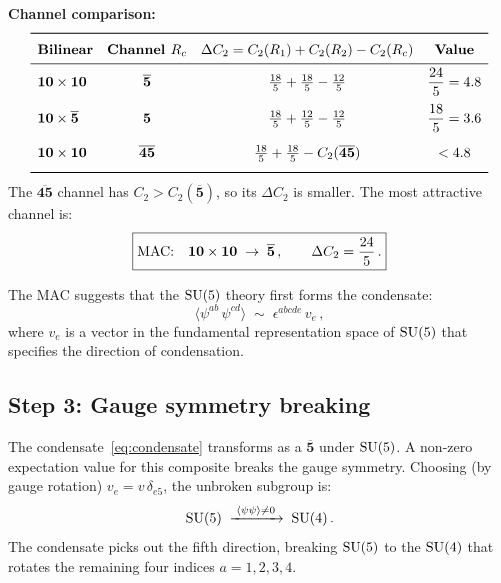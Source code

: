 \documentclass[11pt,a4paper]{article}
\begin{document}
\textbf{Channel comparison:}
\begin{equation}\label{eq:MAC-channels}
\renewcommand{\arraystretch}{1.4}
\begin{array}{l c c c}
\toprule
\textbf{Bilinear} & \textbf{Channel } R_c
  & \Delta C_2 = C_2(R_1) + C_2(R_2) - C_2(R_c)
  & \textbf{Value} \\
\midrule
\mathbf{10} \times \mathbf{10}
  & \overline{\mathbf{5}}
  & \tfrac{18}{5} + \tfrac{18}{5} - \tfrac{12}{5}
  & \dfrac{24}{5} = 4.8 \\[8pt]
\mathbf{10} \times \overline{\mathbf{5}}
  & \mathbf{5}
  & \tfrac{18}{5} + \tfrac{12}{5} - \tfrac{12}{5}
  & \dfrac{18}{5} = 3.6 \\[8pt]
\mathbf{10} \times \mathbf{10}
  & \overline{\mathbf{45}}
  & \tfrac{18}{5} + \tfrac{18}{5} - C_2(\overline{\mathbf{45}})
  & < 4.8 \\[4pt]
\bottomrule
\end{array}
\end{equation}
The $\overline{\mathbf{45}}$ channel has $C_2 > C_2(\overline{\mathbf{5}})$,
so its $\Delta C_2$ is smaller.  The most attractive channel is:
\begin{equation}\label{eq:MAC-result}
  \boxed{%
    \text{MAC:}\quad
    \mathbf{10} \times \mathbf{10}
    \;\to\; \overline{\mathbf{5}}\,,
    \qquad
    \Delta C_2 = \frac{24}{5}\,.
  }
\end{equation}

The MAC suggests that the $\mathrm{SU}(5)$ theory first forms the condensate:
\begin{equation}\label{eq:condensate}
  \langle \psi^{ab}\,\psi^{cd}\rangle
  \;\sim\; \epsilon^{abcde}\, v_e\,,
\end{equation}
where $v_e$ is a vector in the fundamental representation space of
$\mathrm{SU}(5)$ that specifies the direction of condensation.

\subsection{Step 3: Gauge symmetry breaking}

The condensate~\eqref{eq:condensate} transforms as a
$\overline{\mathbf{5}}$ under $\mathrm{SU}(5)$.  A non-zero expectation value
for this composite breaks the gauge symmetry.  Choosing (by gauge
rotation) $v_e = v\,\delta_{e5}$, the unbroken subgroup is:
\begin{equation}\label{eq:SU5-breaking}
  \mathrm{SU}(5) \;\xrightarrow{\;\langle\psi\psi\rangle \neq 0\;}
  \;\mathrm{SU}(4)\,.
\end{equation}
The condensate picks out the fifth direction, breaking $\mathrm{SU}(5)$ to the
$\mathrm{SU}(4)$ that rotates the remaining four indices $a = 1,2,3,4$.
\end{document}
